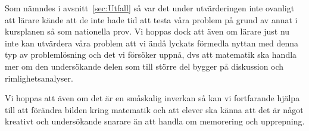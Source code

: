 \textcolor{lila}{Som nämndes i avsnitt~\ref{sec:Utfall} så var det under utvärderingen }\textcolor{Mahogany}{inte ovanligt att lärare kände att de inte hade tid att testa våra problem på grund av annat i kursplanen så som nationella prov. Vi hoppas dock att även om lärare just nu inte kan utvärdera våra problem att vi ändå lyckats förmedla nyttan med denna typ av problemlösning och det vi försöker uppnå, dvs att matematik ska handla mer om den undersökande delen som till större del bygger på diskussion och rimlighetsanalyser.}

\textcolor{Mahogany}{Vi hoppas att även om det är en småskalig inverkan så kan vi fortfarande hjälpa till att förändra bilden kring matematik och att elever ska känna att det är något kreativt och undersökande snarare än att handla om memorering och upprepning.}